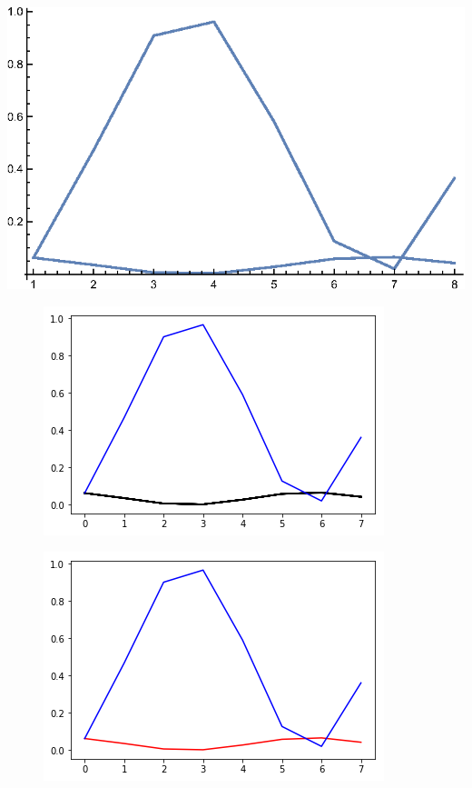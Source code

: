 \includegraphics{img/Grover-2_gr1.eps}

\begin{figure}[H]
\centering \includegraphics[width=0.9\linewidth]{img/groveralllossless.png}
\caption[]{}
\end{figure}

\begin{figure}[H]
\centering \includegraphics[width=0.9\linewidth]{img/groverpairlossless.png}
\caption[]{}
\end{figure}

